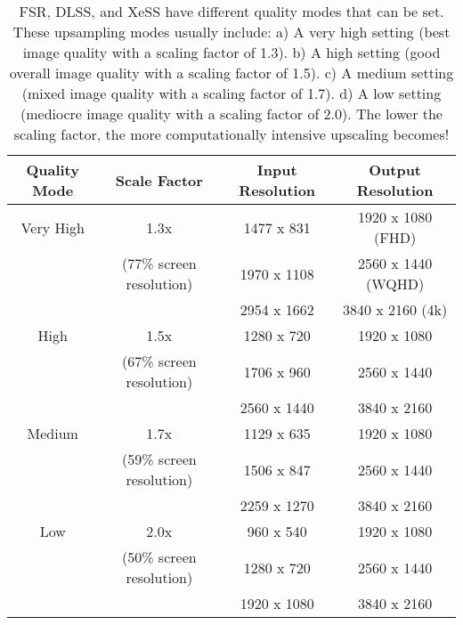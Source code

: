 \documentclass[letterpaper, 10 pt, conference]{ieeeconf}  %
\begin{document}
\begin{table*}[ht]
    \centering
    \caption{FSR, DLSS, and XeSS have different quality modes that can be set. These upsampling modes usually include:
        a) A very high setting (best image quality with a scaling factor of 1.3).
        b) A high setting (good overall image quality with a scaling factor of 1.5).
        c) A medium setting (mixed image quality with a scaling factor of 1.7).
        d) A low setting (mediocre image quality with a scaling factor of 2.0).
    The lower the scaling factor, the more computationally intensive upscaling becomes!}
    \label{tab:qualityModes}
    \begin{tabular}{|c|c|c|c|}
    \hline
    \textbf{Quality Mode} & \textbf{Scale Factor} & \textbf{Input Resolution} & \textbf{Output Resolution} \\
    \hline
    Very High   & 1.3x                          & 1477 x 831  & 1920 x 1080 (FHD) \\
                & (77\% screen resolution)      & 1970 x 1108 & 2560 x 1440 (WQHD) \\
                &                               & 2954 x 1662 & 3840 x 2160 (4k) \\
    \hline
    High        & 1.5x                          & 1280 x 720  & 1920 x 1080 \\
                & (67\% screen resolution)      & 1706 x 960  & 2560 x 1440 \\
                &                               & 2560 x 1440 & 3840 x 2160 \\
    \hline
    Medium      & 1.7x                          & 1129 x 635  & 1920 x 1080 \\
                & (59\% screen resolution)      & 1506 x 847  & 2560 x 1440 \\
                &                               & 2259 x 1270 & 3840 x 2160 \\
    \hline
    Low         & 2.0x                          & 960 x 540   & 1920 x 1080 \\
                & (50\% screen resolution)      & 1280 x 720  & 2560 x 1440 \\
                &                               & 1920 x 1080 & 3840 x 2160 \\
    \hline
    \end{tabular}
\end{table*}
\end{document}
